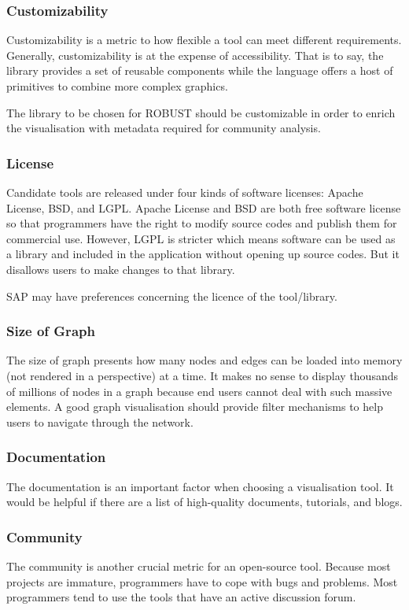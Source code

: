 \subsubsection{Customizability}
Customizability is a metric to how flexible a tool can meet different requirements. Generally, customizability is at the expense of accessibility. That is to say, the library provides a set of reusable components while the language offers a host of primitives to combine more complex graphics.

The library to be chosen for ROBUST should be customizable in order to enrich the visualisation with metadata required for community analysis.

\subsubsection{License}
Candidate tools are released under four kinds of software licenses: Apache License, BSD, and LGPL. Apache License and BSD are both free software license so that programmers have the right to modify source codes and publish them for commercial use. However, LGPL is stricter which means software can be used as a library and included in the application without opening up source codes. But it disallows users to make changes to that library.

SAP may have preferences concerning the licence of the tool/library.

\subsubsection{Size of Graph}
The size of graph presents how many nodes and edges can be loaded into memory (not rendered in a perspective) at a time. It makes no sense to display thousands of millions of nodes in a graph because end users cannot deal with such massive elements. A good graph visualisation should provide filter mechanisms to help users to navigate through the network. 

\subsubsection{Documentation}
The documentation is an important factor when choosing a visualisation tool. It would be helpful if there are a list of high-quality documents, tutorials, and blogs.

\subsubsection{Community}
The community is another crucial metric for an open-source tool. Because most projects are immature, programmers have to cope with bugs and problems. Most programmers tend to use the tools that have an active discussion forum.

